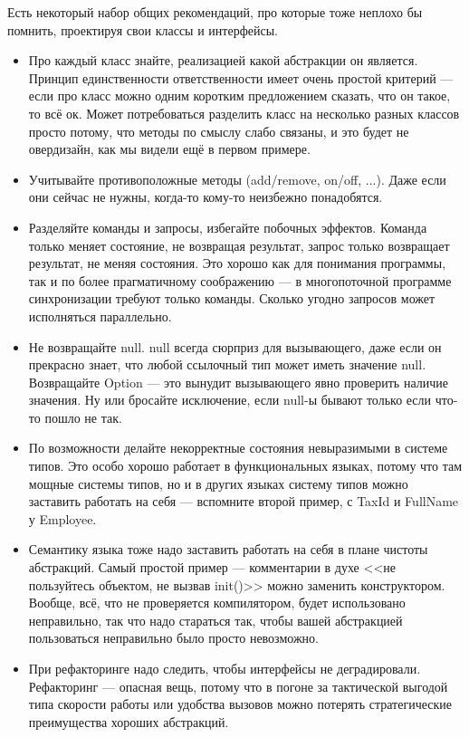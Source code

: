 \documentclass{../text-style}
\begin{document}
Есть некоторый набор общих рекомендаций, про которые тоже неплохо бы помнить, проектируя свои классы и интерфейсы.

\begin{itemize}
    \item Про каждый класс знайте, реализацией какой абстракции он является. Принцип единственности ответственности имеет очень простой критерий --- если про класс можно одним коротким предложением сказать, что он такое, то всё ок. Может потребоваться разделить класс на несколько разных классов просто потому, что методы по смыслу слабо связаны, и это будет не овердизайн, как мы видели ещё в первом примере.
    \item Учитывайте противоположные методы (add/remove, on/off, ...). Даже если они сейчас не нужны, когда-то кому-то неизбежно понадобятся.
    \item Разделяйте команды и запросы, избегайте побочных эффектов. Команда только меняет состояние, не возвращая результат, запрос только возвращает результат, не меняя состояния. Это хорошо как для понимания программы, так и по более прагматичному соображению --- в многопоточной программе синхронизации требуют только команды. Сколько угодно запросов может исполняться параллельно.
    \item Не возвращайте null. null всегда сюрприз для вызывающего, даже если он прекрасно знает, что любой ссылочный тип может иметь значение null. Возвращайте Option --- это вынудит вызывающего явно проверить наличие значения. Ну или бросайте исключение, если null-ы бывают только если что-то пошло не так.
    \item По возможности делайте некорректные состояния невыразимыми в системе типов. Это особо хорошо работает в функциональных языках, потому что там мощные системы типов, но и в других языках систему типов можно заставить работать на себя --- вспомните второй пример, с TaxId и FullName у Employee.
    \item Семантику языка тоже надо заставить работать на себя в плане чистоты абстракций. Самый простой пример --- комментарии в духе <<не пользуйтесь объектом, не вызвав  init()>> можно заменить конструктором. Вообще, всё, что не проверяется компилятором, будет использовано неправильно, так что надо стараться так, чтобы вашей абстракцией пользоваться неправильно было просто невозможно.
    \item При рефакторинге надо следить, чтобы интерфейсы не деградировали. Рефакторинг --- опасная вещь, потому что в погоне за тактической выгодой типа скорости работы или удобства вызовов можно потерять стратегические преимущества хороших абстракций.
\end{itemize}
\end{document}
